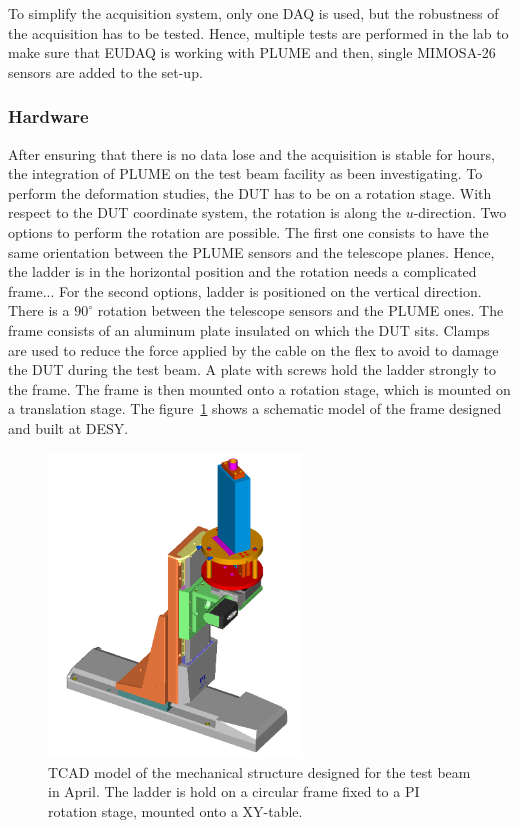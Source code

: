       To simplify the acquisition system, only one DAQ is used, but the robustness of the acquisition has to be tested. 
      Hence, multiple tests are performed in the lab to make sure that EUDAQ is working with \gls{PLUME} and then, single MIMOSA-26 sensors are added to the set-up.

      \subsubsection{Hardware}

      After ensuring that there is no data lose and the acquisition is stable for hours, the integration of \gls{PLUME} on the test beam facility as been investigating.
      To perform the deformation studies, the \gls{DUT} has to be on a rotation stage. 
      With respect to the \gls{DUT} coordinate system, the rotation is along the $u$-direction. 
      Two options to perform the rotation are possible.
      The first one consists to have the same orientation between the \gls{PLUME} sensors and the telescope planes.
      Hence, the ladder is in the horizontal position and the rotation needs a complicated frame...
      For the second options, ladder is positioned on the vertical direction. 
      There is a $90^{\circ}$ rotation between the telescope sensors and the \gls{PLUME} ones.
      The frame consists of an aluminum plate insulated on which the \gls{DUT} sits.
      Clamps are used to reduce the force applied by the cable on the flex to avoid to damage the \gls{DUT} during the test beam.
      A plate with screws hold the ladder strongly to the frame.
      The frame is then mounted onto a rotation stage, which is mounted on a translation stage.
      The figure~\ref{fig:mechanics} shows a schematic model of the frame designed and built at DESY.
      
      \begin{figure}
        \centering
        \includegraphics[width = 0.6\textwidth]{Pictures/X0/Frame/Testbeam1.PNG}
        \caption{TCAD model of the mechanical structure designed for the test beam in April. The ladder is hold on a circular frame fixed to a PI rotation stage, mounted onto a XY-table.}
        \label{fig:mechanics}
      \end{figure}

